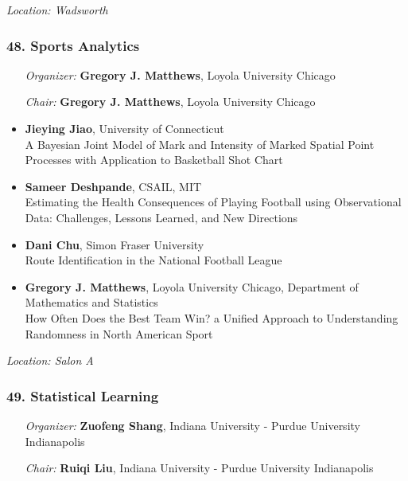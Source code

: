 \emph{Location: Wadsworth}

\subsubsection*{48. Sports Analytics}

\begin{enumerate}[align=left]
\item [\emph{Organizer:}] \textbf{Gregory J. Matthews}, Loyola University Chicago
\item [\emph{Chair:}] \textbf{Gregory J. Matthews}, Loyola University Chicago
\end{enumerate}

\begin{itemize}
\item \textbf{Jieying Jiao}, University of Connecticut \\
A Bayesian Joint Model of Mark and Intensity of Marked   Spatial Point Processes with Application to Basketball Shot Chart
\item \textbf{Sameer Deshpande}, CSAIL, MIT \\
Estimating the Health Consequences of Playing Football using Observational Data: Challenges, Lessons Learned, and New Directions
\item \textbf{Dani Chu}, Simon Fraser University \\
Route Identification in the National Football League
\item \textbf{Gregory J. Matthews}, Loyola University Chicago, Department of Mathematics and Statistics \\
How Often Does the Best Team Win? a Unified Approach to Understanding Randomness in North American Sport
\end{itemize}

\emph{Location: Salon A}

\subsubsection*{49. Statistical Learning}

\begin{enumerate}[align=left]
\item [\emph{Organizer:}] \textbf{Zuofeng Shang}, Indiana University - Purdue University Indianapolis
\item [\emph{Chair:}] \textbf{Ruiqi Liu},  Indiana University - Purdue University Indianapolis
\end{enumerate}

